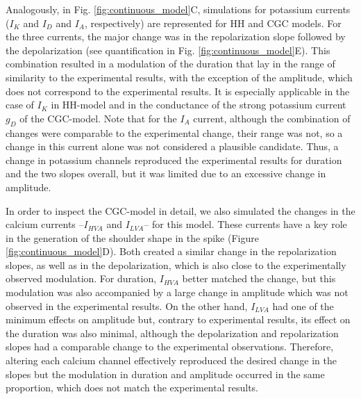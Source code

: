 Analogously, in Fig. \ref{fig:continuous_model}C, simulations for potassium currents ($I_K$ and $I_D$ and $I_A$, respectively) are represented for HH and CGC models. For the three currents, the major change was in the repolarization slope followed by the depolarization (see quantification in Fig. \ref{fig:continuous_model}E). This combination resulted in a modulation of the duration that lay in the range of similarity to the experimental results, with the exception of the amplitude, which does not correspond to the experimental results. It is especially applicable in the case of $I_K$ in HH-model and in the conductance of the strong potassium current $g_D$ of the CGC-model. Note that for the $I_A$ current, although the combination of changes were comparable to the experimental change, their range was not, so a change in this current alone was not considered a plausible candidate. Thus, a change in potassium channels reproduced the experimental results for duration and the two slopes overall, but it was limited due to 
an excessive change in amplitude.

In order to inspect the CGC-model in detail, we also simulated the changes in the calcium currents --$I_{HVA}$ and $I_{LVA}$-- for this model. These currents have a key role in the generation of the shoulder shape in the spike (Figure \ref{fig:continuous_model}D). Both created a similar change in the repolarization slopes, as well as in the depolarization, which is also close to the experimentally observed modulation. For duration, $I_{HVA}$ better matched the change, but this modulation was also accompanied by a large change in amplitude which was not observed in the experimental results. On the other hand, $I_{LVA}$ had one of the minimum effects on amplitude but, contrary to experimental results, its effect on the duration was also minimal, although the depolarization and repolarization slopes had a comparable change to the experimental observations. Therefore, altering each calcium channel effectively reproduced the desired change in the slopes but the modulation in duration and amplitude occurred in the same proportion, which does not match the experimental results.

